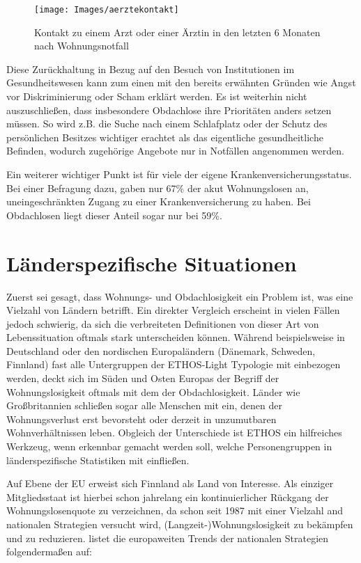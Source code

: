 \begin{figure}[h]
	\centering
	\texttt{[image: Images/aerztekontakt]}
	\caption[Ärztekontakt nach Wohnungsnotfall]{Kontakt zu einem Arzt oder einer Ärztin in den letzten 6 Monaten nach Wohnungsnotfall \citep{BAGW.2022}}
	\label{fig:aerztekontakt}
\end{figure}

Diese Zurückhaltung in Bezug auf den Besuch von Institutionen im Gesundheitswesen kann zum einen mit den bereits erwähnten Gründen wie Angst vor Diskriminierung oder Scham \citep{Kaduszkiewicz.2017} erklärt werden. Es ist weiterhin nicht auszuschließen, dass insbesondere Obdachlose ihre Prioritäten anders setzen müssen. So wird z.B. die Suche nach einem Schlafplatz oder der Schutz des persönlichen Besitzes wichtiger erachtet als das eigentliche gesundheitliche Befinden, wodurch zugehörige Angebote nur in Notfällen angenommen werden.

Ein weiterer wichtiger Punkt ist für viele der eigene Krankenversicherungsstatus. Bei einer Befragung dazu, gaben nur 67\% der akut Wohnungslosen an, uneingeschränkten Zugang zu einer Krankenversicherung zu haben. Bei Obdachlosen liegt dieser Anteil sogar nur bei 59\%.

\section{Länderspezifische Situationen}

Zuerst sei gesagt, dass Wohnungs- und Obdachlosigkeit ein Problem ist, was eine Vielzahl von Ländern betrifft. Ein direkter Vergleich erscheint in vielen Fällen jedoch schwierig, da sich die verbreiteten Definitionen von dieser Art von Lebenssituation oftmals stark unterscheiden können. Während beispielsweise in Deutschland oder den nordischen Europaländern (Dänemark, Schweden, Finnland) fast alle Untergruppen der ETHOS-Light Typologie mit einbezogen werden, deckt sich im Süden und Osten Europas der Begriff der Wohnungslosigkeit oftmals mit dem der Obdachlosigkeit. Länder wie Großbritannien schließen sogar alle Menschen mit ein, denen der Wohnungsverlust erst bevorsteht oder derzeit in unzumutbaren Wohnverhältnissen leben. Obgleich der Unterschiede ist ETHOS ein hilfreiches Werkzeug, wenn erkennbar gemacht werden soll, welche Personengruppen in länderspezifische Statistiken mit einfließen. \citep{Busch-Geertsema.2018}

Auf Ebene der EU erweist sich Finnland als Land von Interesse. Als einziger Mitgliedsstaat ist hierbei schon jahrelang ein kontinuierlicher Rückgang der Wohnungslosenquote zu verzeichnen, da schon seit 1987 mit einer Vielzahl and nationalen Strategien versucht wird, (Langzeit-)Wohnungslosigkeit zu bekämpfen und zu reduzieren. \citet{Busch-Geertsema.2012} listet die europaweiten Trends der nationalen Strategien folgendermaßen auf:


